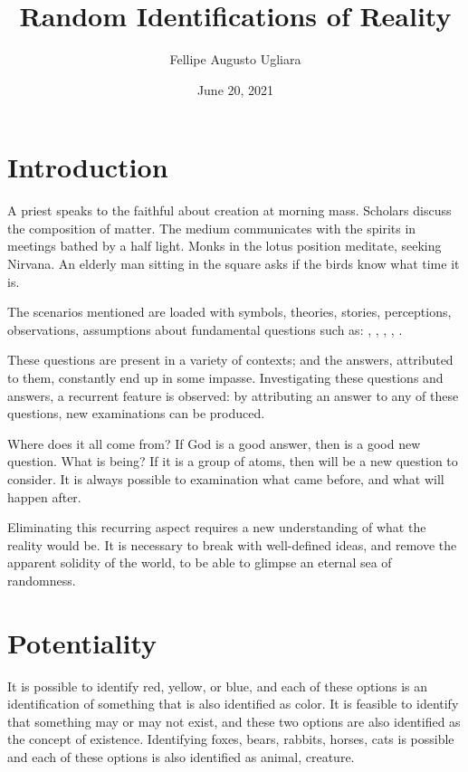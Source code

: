 \documentclass[11pt]{article}
\title{Random Identifications of Reality}
\author{Fellipe Augusto Ugliara}
\date{June 20, 2021}
\begin{document}
	\maketitle
	
	\section{Introduction} \label{pt-s1}
	
	A priest speaks to the faithful about creation at morning mass. Scholars discuss the composition of matter. The medium communicates with the spirits in meetings bathed by a half light. Monks in the lotus position meditate, seeking Nirvana. An elderly man sitting in the square asks if the birds know what time it is.
	
	The scenarios mentioned are loaded with symbols, theories, stories, perceptions, observations, assumptions about fundamental questions such as: , , , , .
	
	These questions are present in a variety of contexts; and the answers, attributed to them, constantly end up in some impasse. Investigating these questions and answers, a recurrent feature is observed: by attributing an answer to any of these questions, new examinations can be produced. 
	
	Where does it all come from? If God is a good answer, then  is a good new question. What is being? If it is a group of atoms, then  will be a new question to consider. It is always possible to examination what came before, and what will happen after. 
	
	Eliminating this recurring aspect requires a new understanding of what the reality would be. It is necessary to break with well-defined ideas, and remove the apparent solidity of the world, to be able to glimpse an eternal sea of randomness.
		
	\section{Potentiality} \label{pt-s2}
	
	It is possible to identify red, yellow, or blue, and each of these options is an identification of something that is also identified as color. It is feasible to identify that something may or may not exist, and these two options are also identified as the concept of existence. Identifying foxes, bears, rabbits, horses, cats is possible and each of these options is also identified as animal, creature.
	
\end{document}
